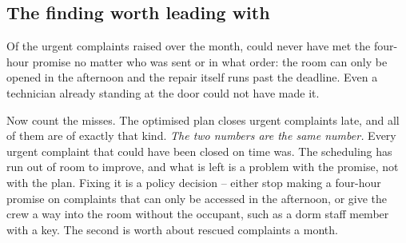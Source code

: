 \documentclass[11pt]{article}
\begin{document}
\subsection{The finding worth leading with}
Of the \NUrgentTotal{} urgent complaints raised over the month,
\NUrgentImpossible{} could never have met the four-hour promise no matter who
was sent or in what order: the room can only be opened in the afternoon and
the repair itself runs past the deadline. Even a technician already standing
at the door could not have made it.

Now count the misses. The optimised plan closes \NImpUrgentLate{} urgent
complaints late, and all \NImpUrgentUnavoidable{} of them are of exactly that
kind. \emph{The two numbers are the same number.} Every urgent complaint that
could have been closed on time was. The scheduling has run out of room to
improve, and what is left is a problem with the promise, not with the plan.
Fixing it is a policy decision -- either stop making a four-hour promise on
complaints that can only be accessed in the afternoon, or give the crew a way
into the room without the occupant, such as a dorm staff member with a key.
The second is worth about \NUrgentImpossible{} rescued complaints a month.
\end{document}
